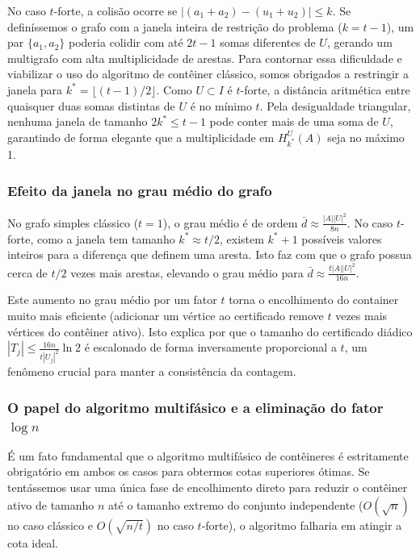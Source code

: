 \documentclass[reqno,a4paper,12pt]{amsart}
\begin{document}
No caso $t$-forte, a colisão ocorre se $|(a_1+a_2) - (u_1+u_2)| \le k$. Se definíssemos o grafo com a janela inteira de restrição do problema ($k = t-1$), um par $\{a_1,a_2\}$ poderia colidir com até $2t-1$ somas diferentes de $U$, gerando um multigrafo com alta multiplicidade de arestas. Para contornar essa dificuldade e viabilizar o uso do algoritmo de contêiner clássico, somos obrigados a restringir a janela para $k^* = \lfloor(t-1)/2\rfloor$.
Como $U \subset I$ é $t$-forte, a distância aritmética entre quaisquer duas somas distintas de $U$ é no mínimo $t$. Pela desigualdade triangular, nenhuma janela de tamanho $2k^* \le t-1$ pode conter mais de uma soma de $U$, garantindo de forma elegante que a multiplicidade em $H_{k^*}^U(A)$ seja no máximo 1.

\subsubsection{Efeito da janela no grau médio do grafo}
No grafo simples clássico ($t=1$), o grau médio é de ordem $\bar{d} \approx \frac{|A||U|^2}{8n}$. No caso $t$-forte, como a janela tem tamanho $k^* \approx t/2$, existem $k^*+1$ possíveis valores inteiros para a diferença que definem uma aresta. Isto faz com que o grafo possua cerca de $t/2$ vezes mais arestas, elevando o grau médio para $\bar{d} \approx \frac{t|A||U|^2}{16n}$.

Este aumento no grau médio por um fator $t$ torna o encolhimento do container muito mais eficiente (adicionar um vértice ao certificado remove $t$ vezes mais vértices do contêiner ativo). Isto explica por que o tamanho do certificado diádico $|T_j| \le \frac{16n}{t|U_j|^2}\ln 2$ é escalonado de forma inversamente proporcional a $t$, um fenômeno crucial para manter a consistência da contagem.

\subsubsection{O papel do algoritmo multifásico e a eliminação do fator $\log n$}
É um fato fundamental que o algoritmo multifásico de contêineres é estritamente obrigatório em ambos os casos para obtermos cotas superiores ótimas. Se tentássemos usar uma única fase de encolhimento direto para reduzir o contêiner ativo de tamanho $n$ até o tamanho extremo do conjunto independente ($O(\sqrt{n})$ no caso clássico e $O(\sqrt{n/t})$ no caso $t$-forte), o algoritmo falharia em atingir a cota ideal.
\end{document}
